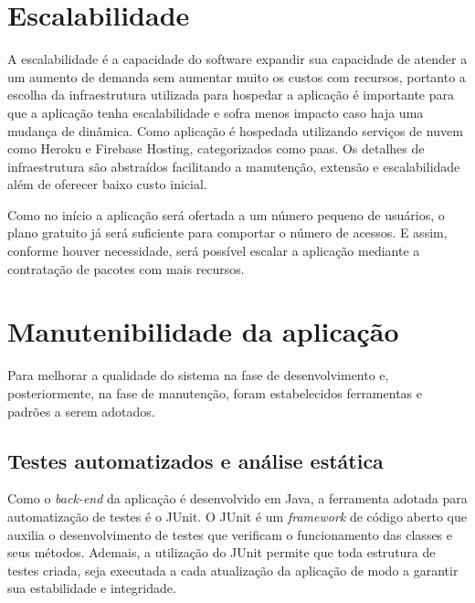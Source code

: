 \section{Escalabilidade}
A escalabilidade é a capacidade do software expandir sua capacidade de atender a um aumento de demanda sem aumentar muito os custos com recursos, portanto a escolha da infraestrutura utilizada para hospedar a aplicação é importante para que a aplicação tenha escalabilidade e sofra menos impacto caso haja uma mudança de dinâmica. Como aplicação é hospedada utilizando serviços de nuvem como Heroku e Firebase Hosting, categorizados como \ac{paas}. Os detalhes de infraestrutura são abstraídos facilitando a manutenção, extensão e escalabilidade além de oferecer baixo custo inicial. 

Como no início a aplicação será ofertada a um número pequeno de usuários, o plano gratuito já será suficiente para comportar o número de acessos. E assim, conforme houver necessidade, será possível escalar a aplicação mediante a contratação de pacotes com mais recursos.

\section{Manutenibilidade da aplicação}
Para melhorar a qualidade do sistema na fase de desenvolvimento e, posteriormente, na fase de manutenção, foram estabelecidos ferramentas e padrões a serem adotados.

\subsection{Testes automatizados e análise estática}


Como o \textit{\gls{back-end}} da aplicação é desenvolvido em Java, a ferramenta adotada para automatização de testes é o JUnit. O JUnit é um \textit{\gls{framework}} de código aberto que auxilia o desenvolvimento de testes que verificam o funcionamento das classes e seus métodos. Ademais, a utilização do JUnit permite que toda estrutura de testes criada, seja executada a cada atualização da aplicação  de modo a garantir sua estabilidade e integridade.




